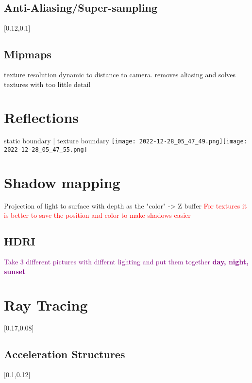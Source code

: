 \documentclass[main.tex,fontsize=12pt,paper=a4,paper=landscape,DIV=calc,]{scrartcl}
\begin{document}
\begin{multicols*}{4}
\subsection{Anti-Aliasing/Super-sampling}
[0.12,0.1]

\subsection{Mipmaps}
texture resolution dynamic to distance to camera.\newline
removes aliasing and solves textures with too little detail

\section{Reflections}
static boundary | texture boundary\newline
\texttt{[image: 2022-12-28\_05\_47\_49.png]}\texttt{[image: 2022-12-28\_05\_47\_55.png]}

\section{Shadow mapping}
Projection of light to surface with depth as the "color" -> Z buffer\newline
\textcolor{red}{For textures it is better to save the position and color to make shadows easier}

\subsection{HDRI}
\textcolor{purple}{Take 3 different pictures with differnt lighting and put them together\newline
\textbf{day, night, sunset}}

\section{Ray Tracing}
[0.17,0.08]

\subsection{Acceleration Structures}
[0.1,0.12]


\end{multicols*}
\end{document}
